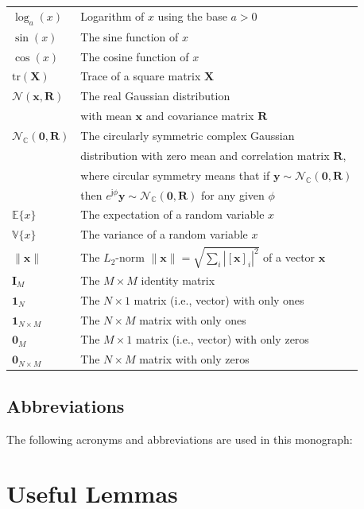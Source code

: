 \documentclass[SIG,biber]{nowfnt}
\newcommand{\vect}[1]{\mathbf{#1}}
\def\tr{\mathrm{tr}}
\def\CN{\mathcal{N}_{\mathbb{C}}}
\def\imagunit{\mathsf{j}}
\begin{document}
\begin{longtable}{ll}
   $\log_a(x)$ & Logarithm of $x$ using the base $a >0$\\
   $\sin(x)$ & The sine function of $x$ \\   
   $\cos(x)$ & The cosine function of $x$ \\   
   $\tr( \vect{X})$ & Trace of a square matrix $\vect{X}$ \\
   $\mathcal{N}(\vect{x},\vect{R})$ & The real Gaussian distribution \\ & with mean $\vect{x}$ and covariance matrix $\vect{R}$ \\
   $\CN(\vect{0},\vect{R})$ & The circularly symmetric complex Gaussian   \\ &  distribution with zero mean and correlation matrix $\vect{R}$,  \\ & where circular symmetry means that if $\vect{y} \sim \CN(\vect{0},\vect{R})$ \\ & then $e^{\imagunit \phi}\vect{y} \sim \CN(\vect{0},\vect{R})$ for any given $\phi$ \\
   $\mathbb{E}\{ {x} \}$ & The expectation of a random variable $x$ \\
   $\mathbb{V}\{ {x} \}$ & The variance of a random variable $x$ \\
   $\|\vect{x}\|$ & The $L_2$-norm $\|\vect{x}\| = \sqrt{ \sum_i | [\vect{x}]_i |^2 }$ of  a vector $\vect{x}$ \\
   $\vect{I}_M$ & The $M \times M$ identity matrix \\
   $\vect{1}_N$ & The $N \times 1$ matrix (i.e., vector) with only ones \\
   $\vect{1}_{N\times M}$ & The $N \times M$ matrix with only ones \\
   $\vect{0}_{M}$ & The $M \times 1$ matrix (i.e., vector) with only zeros \\
       $\vect{0}_{N \times M}$ & The $N \times M$ matrix with only zeros \\
\end{longtable}


\section*{Abbreviations}

The following acronyms and abbreviations are used in this monograph:
\newpage
\enlargethispage{\baselineskip}
\printnoidxglossaries



\chapter{Useful Lemmas}\label{appendix1}
\vspace*{-1.2in}
\end{document}
